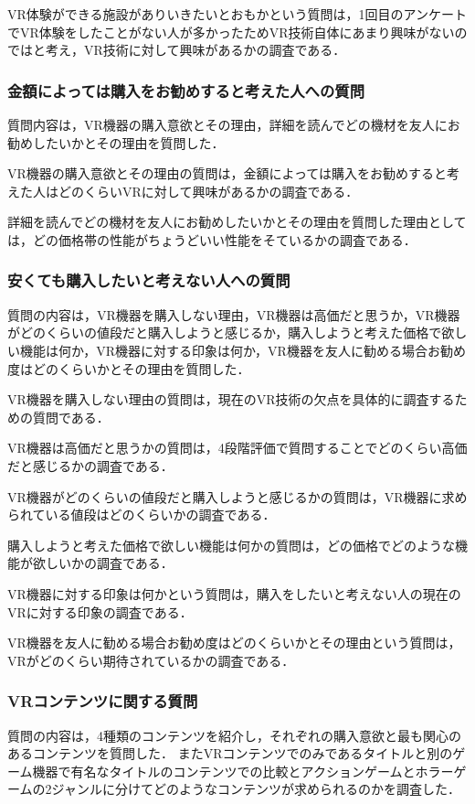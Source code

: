 \documentclass[12pt,a4j]{ltjsarticle}
\begin{document}
VR体験ができる施設がありいきたいとおもかという質問は，1回目のアンケートでVR体験をしたことがない人が多かったためVR技術自体にあまり興味がないのではと考え，VR技術に対して興味があるかの調査である．

\subsubsection{金額によっては購入をお勧めすると考えた人への質問}
質問内容は，VR機器の購入意欲とその理由，詳細を読んでどの機材を友人にお勧めしたいかとその理由を質問した．

VR機器の購入意欲とその理由の質問は，金額によっては購入をお勧めすると考えた人はどのくらいVRに対して興味があるかの調査である．

詳細を読んでどの機材を友人にお勧めしたいかとその理由を質問した理由としては，どの価格帯の性能がちょうどいい性能をそているかの調査である．


\subsubsection{安くても購入したいと考えない人への質問}
質問の内容は，VR機器を購入しない理由，VR機器は高価だと思うか，VR機器がどのくらいの値段だと購入しようと感じるか，購入しようと考えた価格で欲しい機能は何か，VR機器に対する印象は何か，VR機器を友人に勧める場合お勧め度はどのくらいかとその理由を質問した．

VR機器を購入しない理由の質問は，現在のVR技術の欠点を具体的に調査するための質問である．

VR機器は高価だと思うかの質問は，4段階評価で質問することでどのくらい高価だと感じるかの調査である．

VR機器がどのくらいの値段だと購入しようと感じるかの質問は，VR機器に求められている値段はどのくらいかの調査である．

購入しようと考えた価格で欲しい機能は何かの質問は，どの価格でどのような機能が欲しいかの調査である．

VR機器に対する印象は何かという質問は，購入をしたいと考えない人の現在のVRに対する印象の調査である．

VR機器を友人に勧める場合お勧め度はどのくらいかとその理由という質問は，VRがどのくらい期待されているかの調査である．

\subsubsection{VRコンテンツに関する質問}
質問の内容は，4種類のコンテンツを紹介し，それぞれの購入意欲と最も関心のあるコンテンツを質問した．
またVRコンテンツでのみであるタイトルと別のゲーム機器で有名なタイトルのコンテンツでの比較とアクションゲームとホラーゲームの2ジャンルに分けてどのようなコンテンツが求められるのかを調査した．
\end{document}
